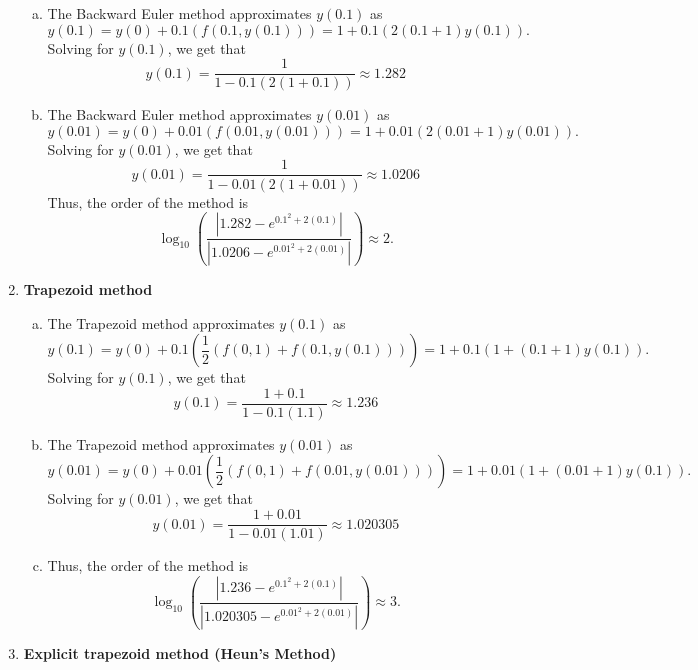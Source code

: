 \documentclass[11pt]{article}
\theoremstyle{definition}
\begin{document}
\begin{enumerate}
    \begin{enumerate}[a)]
        \item The Backward Euler method approximates $y(0.1)$ as \[ y(0.1) = y(0) + 0.1(f(0.1, y(0.1))) = 1 + 0.1(2(0.1+1)y(0.1)). \]
        Solving for $y(0.1)$, we get that \[ y(0.1) = \frac{1}{1 - 0.1(2(1+0.1))} \approx \boxed{1.282}\]
        \item The Backward Euler method approximates $y(0.01)$ as \[ y(0.01) = y(0) + 0.01(f(0.01, y(0.01))) = 1 + 0.01(2(0.01+1)y(0.01)). \]
        Solving for $y(0.01)$, we get that \[ y(0.01) = \frac{1}{1 - 0.01(2(1+0.01))} \approx \boxed{1.0206} \]
         Thus, the order of the method is \[ \log_{10} \left(\frac{\left|1.282 - e^{0.1^2 + 2(0.1)}\right|}{\left|1.0206 - e^{0.01^2 + 2(0.01)}\right|}  \right) \approx \boxed{2}. \]
    \end{enumerate}

    \item \textbf{Trapezoid method}
  
    \begin{enumerate}[a)]
        \item The Trapezoid method approximates $y(0.1)$ as \[ y(0.1) = y(0) + 0.1\left(\frac{1}{2}(f(0, 1) + f(0.1, y(0.1)))\right) = 
        1 + 0.1(1 + (0.1+1)y(0.1)). \]
        Solving for $y(0.1)$, we get that \[ y(0.1) = \frac{1 + 0.1}{1 - 0.1(1.1)} \approx \boxed{1.236} \]
        \item The Trapezoid method approximates $y(0.01)$ as \[ y(0.01) = y(0) + 0.01\left(\frac{1}{2}(f(0, 1) + f(0.01, y(0.01)))\right) = 
        1 + 0.01(1 + (0.01+1)y(0.1)). \]
        Solving for $y(0.01)$, we get that \[ y(0.01) = \frac{1 + 0.01}{1 - 0.01(1.01)} \approx \boxed{1.020305} \]
        \item Thus, the order of the method is \[ \log_{10} \left( \frac{\left|1.236 - e^{0.1^2 + 2(0.1)}\right|}{\left|1.020305 - e^{0.01^2 + 2(0.01)} \right|} \right) \approx \boxed{3}. \]
    \end{enumerate}

    \item \textbf{Explicit trapezoid method (Heun's Method)}
    

\end{enumerate}
\end{document}
